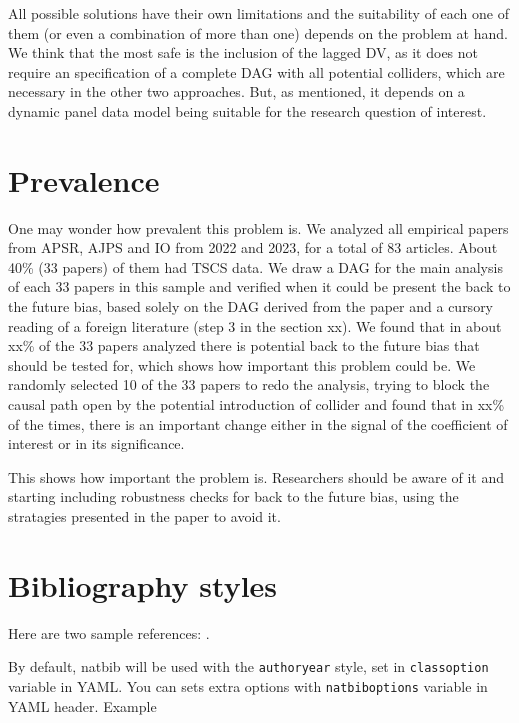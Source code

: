 \documentclass[
  super,
  preprint,
  3p]{elsarticle}
\begin{document}
All possible solutions have their own limitations and the suitability of
each one of them (or even a combination of more than one) depends on the
problem at hand. We think that the most safe is the inclusion of the
lagged DV, as it does not require an specification of a complete DAG
with all potential colliders, which are necessary in the other two
approaches. But, as mentioned, it depends on a dynamic panel data model
being suitable for the research question of interest.

\hypertarget{prevalence}{%
\section{Prevalence}\label{prevalence}}

One may wonder how prevalent this problem is. We analyzed all empirical
papers from APSR, AJPS and IO from 2022 and 2023, for a total of 83
articles. About 40\% (33 papers) of them had TSCS data. We draw a DAG
for the main analysis of each 33 papers in this sample and verified when
it could be present the back to the future bias, based solely on the DAG
derived from the paper and a cursory reading of a foreign literature
(step 3 in the section xx). We found that in about xx\% of the 33 papers
analyzed there is potential back to the future bias that should be
tested for, which shows how important this problem could be. We randomly
selected 10 of the 33 papers to redo the analysis, trying to block the
causal path open by the potential introduction of collider and found
that in xx\% of the times, there is an important change either in the
signal of the coefficient of interest or in its significance.

This shows how important the problem is. Researchers should be aware of
it and starting including robustness checks for back to the future bias,
using the stratagies presented in the paper to avoid it.

\hypertarget{bibliography-styles}{%
\section{Bibliography styles}\label{bibliography-styles}}

Here are two sample references: \citet{Feynman1963118}
\citet{Dirac1953888}.

By default, natbib will be used with the \texttt{authoryear} style, set
in \texttt{classoption} variable in YAML. You can sets extra options
with \texttt{natbiboptions} variable in YAML header. Example
\end{document}
